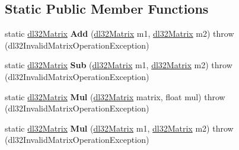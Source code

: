 \subsection*{Static Public Member Functions}
\begin{DoxyCompactItemize}
\item 
\hypertarget{classdl32_matrix_a22209d789107e62e223dd451c26abfbf}{static \hyperlink{classdl32_matrix}{dl32\-Matrix} {\bfseries Add} (\hyperlink{classdl32_matrix}{dl32\-Matrix} m1, \hyperlink{classdl32_matrix}{dl32\-Matrix} m2)  throw (dl32\-Invalid\-Matrix\-Operation\-Exception)}\label{classdl32_matrix_a22209d789107e62e223dd451c26abfbf}

\item 
\hypertarget{classdl32_matrix_a46a1f0e30e9b2a06c648442052b4dde0}{static \hyperlink{classdl32_matrix}{dl32\-Matrix} {\bfseries Sub} (\hyperlink{classdl32_matrix}{dl32\-Matrix} m1, \hyperlink{classdl32_matrix}{dl32\-Matrix} m2)  throw (dl32\-Invalid\-Matrix\-Operation\-Exception)}\label{classdl32_matrix_a46a1f0e30e9b2a06c648442052b4dde0}

\item 
\hypertarget{classdl32_matrix_a94b5defb7c99f19e42f6e4dbdd0f7264}{static \hyperlink{classdl32_matrix}{dl32\-Matrix} {\bfseries Mul} (\hyperlink{classdl32_matrix}{dl32\-Matrix} matrix, float mul)  throw (dl32\-Invalid\-Matrix\-Operation\-Exception)}\label{classdl32_matrix_a94b5defb7c99f19e42f6e4dbdd0f7264}

\item 
\hypertarget{classdl32_matrix_a2f53b5e969990869f72a761677f0069a}{static \hyperlink{classdl32_matrix}{dl32\-Matrix} {\bfseries Mul} (\hyperlink{classdl32_matrix}{dl32\-Matrix} m1, \hyperlink{classdl32_matrix}{dl32\-Matrix} m2)  throw (dl32\-Invalid\-Matrix\-Operation\-Exception)}\label{classdl32_matrix_a2f53b5e969990869f72a761677f0069a}

\end{DoxyCompactItemize}
